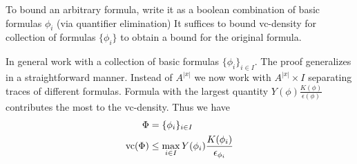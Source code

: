 To bound an arbitrary formula, write it as a boolean combination of basic formulas $\phi_i$ (via quantifier elimination)
It suffices to bound vc-density for collection of formulas $\{\phi_i\}$ to obtain a bound for the original formula.

In general work with a collection of basic formulas $\{\phi_i\}_{i \in I}$.
The proof generalizes in a straightforward manner.
Instead of $A^{|x|}$ we now work with $A^{|x|} \times I$ separating traces of different formulas.
Formula with the largest quantity $Y(\phi)\frac{K(\phi)}{\epsilon(\phi)}$ contributes the most to the vc-density.
Thus we have
\begin{align*}
  \Phi &= \{\phi_i\}_{i \in I} \\
  \operatorname{vc}(\Phi) &\leq   \max_{i \in I} Y(\phi_i) \frac{K(\phi_i)}{\epsilon_{\phi_i}}
\end{align*}